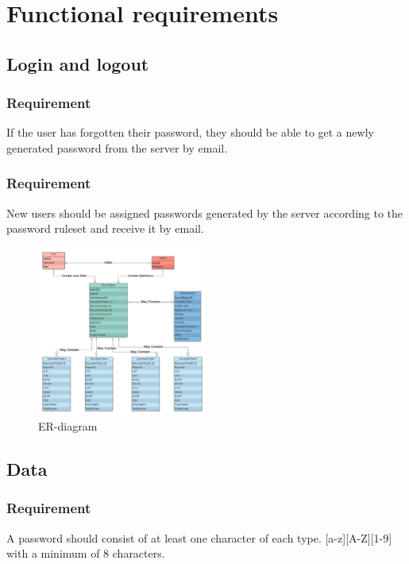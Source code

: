 \documentclass{article}
\begin{document}
\section{Functional requirements}
\subsection{Login and logout}


\subsubsection{Requirement}
If the user has forgotten their password, they should be able to get a newly generated password from the server by email.

\subsubsection{Requirement}
New users should be assigned passwords generated by the server according to the password ruleset and receive it by email.



\begin{figure}[ht]
\centering
\includegraphics[width=0.5\textwidth]{PUSPERdiagram.png}
\caption{ER-diagram}
\end{figure}





\subsection{Data}
\subsubsection{Requirement}
A password should consist of at least one character of each type. [a-z][A-Z][1-9] with a minimum of 8 characters.
\end{document}
